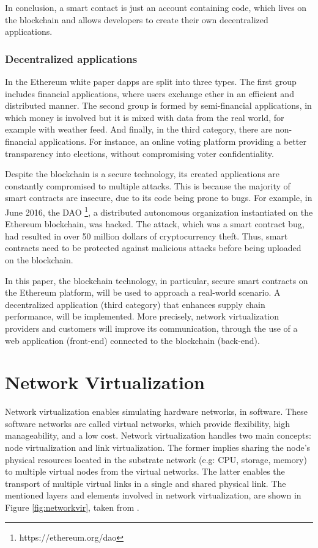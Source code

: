 In conclusion, a smart contact is just an account containing code, which lives on the blockchain and allows developers to create their own decentralized applications. 

\subsubsection{Decentralized applications}

In the Ethereum white paper \cite{buterin2014next} dapps are split into three types. The first group includes financial applications, where users exchange ether in an efficient and distributed manner. The second group is formed by semi-financial applications, in which money is involved but it is mixed with data from the real world, for example with weather feed. And finally, in the third category, there are non-financial applications. For instance, an online voting platform providing a better transparency into elections, without compromising voter confidentiality.

Despite the blockchain is a secure technology, its created applications are constantly compromised to multiple attacks. This is because the majority of smart contracts are insecure, due to its code being prone to bugs.
For example, in June 2016, the DAO \footnote{https://ethereum.org/dao}, a distributed autonomous organization instantiated on the Ethereum blockchain, was hacked. The attack, which was a smart contract bug, had resulted in over 50 million dollars of cryptocurrency theft. Thus, smart contracts need to be protected against malicious attacks before being uploaded on the blockchain.

In this paper, the blockchain technology, in particular, secure smart contracts on the Ethereum platform, will be used to approach a real-world scenario. A decentralized application (third category) that enhances supply chain performance, will be implemented. More precisely, network virtualization providers and customers will improve its communication, through the use of a web application (front-end) connected to the blockchain (back-end).


\section{Network Virtualization}

Network virtualization enables simulating hardware networks, in software. These software networks are called virtual networks, which provide flexibility, high manageability, and a low cost. Network virtualization handles two main concepts: node virtualization and link virtualization. The former implies sharing the node's physical resources located in the substrate network (e.g: CPU, storage, memory) to multiple virtual nodes from the virtual networks. The latter enables the transport of multiple virtual links in a single and shared physical link. The mentioned layers and elements involved in network virtualization, are shown in Figure \ref{fig:networkvir}, taken from \cite{carapinha2009network}.


